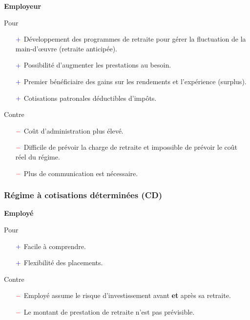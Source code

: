 \documentclass[10pt, french]{article}
\begin{document}
\begin{multicols*}{3}
\begin{center}
	\textbf{Employeur}
\end{center}
Pour
\begin{itemize}
	\item[$\color{blue}+$]	Développement des programmes de retraite pour gérer la fluctuation de la main-d'œuvre (retraite anticipée).
	\item[$\color{blue}+$]	Possibilité d'augmenter les prestations au besoin.
	\item[$\color{blue}+$]	Premier bénéficiaire des gains sur les rendements et l'expérience (surplus).
	\item[$\color{blue}+$]	Cotisations patronales déductibles d'impôts.
\end{itemize}

Contre
\begin{itemize}
	\item[$\color{red}-$]	Coût d'administration plus élevé.
	\item[$\color{red}-$]	Difficile de prévoir la charge de retraite et impossible de prévoir le coût réel du régime.
	\item[$\color{red}-$]	Plus de communication est nécessaire.
\end{itemize}

\subsubsection*{Régime à cotisations déterminées (CD)}
\begin{center}
	\textbf{Employé}
\end{center}
Pour
\begin{itemize}
	\item[$\color{blue}+$]	Facile à comprendre.
	\item[$\color{blue}+$]	Flexibilité des placements.
\end{itemize}


Contre
\begin{itemize}
	\item[$\color{red}-$]	Employé assume le risque d'investissement avant \textbf{et} après sa retraite.
	\item[$\color{red}-$]	Le montant de prestation de retraite n'est pas prévisible.
\end{itemize}


\end{multicols*}
\end{document}
